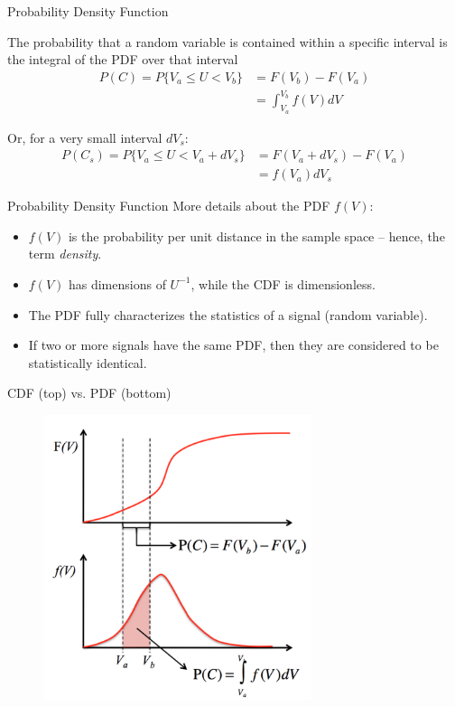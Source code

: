 \begin{frame}{Probability Density Function}

The probability that a random variable is contained within a specific interval is the integral of the PDF over that interval 
\begin{align*}
P(C) = P\{V_a \leq U < V_b \} &= F(V_b) - F(V_a)\\
&= \int^{V_b}_{V_a} f(V) dV
\end{align*}

Or, for a very small interval $dV_s$:
\begin{align*}
P(C_s) = P\{V_a \leq U < V_a + dV_s \} &= F(V_a + dV_s) - F(V_a)\\
&= f(V_a)dV_s
\end{align*}

\end{frame}


\begin{frame}{Probability Density Function}
More details about the PDF $f(V)$:
\begin{itemize}
	\item $f(V)$ is the probability per unit distance in the sample space -- hence, the term \textit{density}.
	\item $f(V)$ has dimensions of $U^{-1}$, while the CDF is dimensionless.
	\item The PDF fully characterizes the statistics of a signal (random variable).
	\item If two or more signals have the same PDF, then they are considered to be statistically identical.
	\end{itemize}
\end{frame}


\begin{frame}{CDF (top) vs. PDF (bottom)}
  \begin{figure}[H]
  \centering
  \includegraphics[width=0.7\textwidth]{cdfpdf.png}
  \end{figure}
\end{frame}

